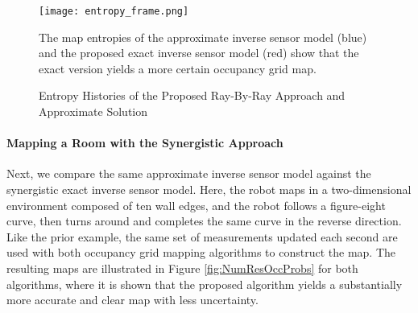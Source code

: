 \begin{figure}
  \centering
  \texttt{[image: entropy\_frame.png]}
  \caption{Entropy Histories of the Proposed Ray-By-Ray Approach and Approximate Solution}
  	\medskip
	\small
	The map entropies of the approximate inverse sensor model (blue) and the proposed exact inverse sensor model (red) show that the exact version yields a more certain occupancy grid map.
\label{fig:entropy}
\end{figure}



\paragraph{Mapping a Room with the Synergistic Approach}

Next, we compare the same approximate inverse sensor model against the synergistic exact inverse sensor model.
Here, the robot maps in a two-dimensional environment composed of ten wall edges, and the robot follows a figure-eight curve, then turns around and completes the same curve in the reverse direction. Like the prior example, the same set of measurements updated each second are used with both occupancy grid mapping algorithms to construct the map.
The resulting maps are illustrated in Figure \ref{fig:NumResOccProbs} for both algorithms, where it is shown that the proposed algorithm yields a substantially more accurate and clear map with less uncertainty. 


